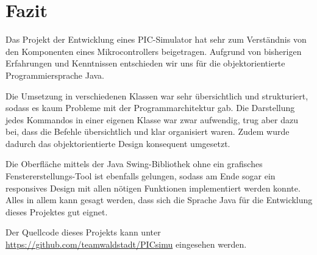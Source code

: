 \chapter{Fazit}

Das Projekt der Entwicklung eines PIC-Simulator hat sehr zum Verständnis von den Komponenten eines Mikrocontrollers beigetragen. Aufgrund von bisherigen Erfahrungen und Kenntnissen entschieden wir uns für die objektorientierte Programmiersprache Java.

Die Umsetzung in verschiedenen Klassen war sehr übersichtlich und strukturiert, sodass es kaum Probleme mit der Programmarchitektur gab. Die Darstellung jedes Kommandos in einer eigenen Klasse war zwar aufwendig, trug aber dazu bei, dass die Befehle übersichtlich und klar organisiert waren. Zudem wurde dadurch das objektorientierte Design konsequent umgesetzt.

Die Oberfläche mittels der Java Swing-Bibliothek ohne ein grafisches Fenstererstellungs-Tool ist ebenfalls gelungen, sodass am Ende sogar ein responsives Design mit allen nötigen Funktionen implementiert werden konnte. Alles in allem kann gesagt werden, dass sich die Sprache Java für die Entwicklung dieses Projektes gut eignet.

Der Quellcode dieses Projekts kann unter \href{https://github.com/teamwaldstadt/PICsimu/}{https://github.com/teamwaldstadt/PICsimu} eingesehen werden.
